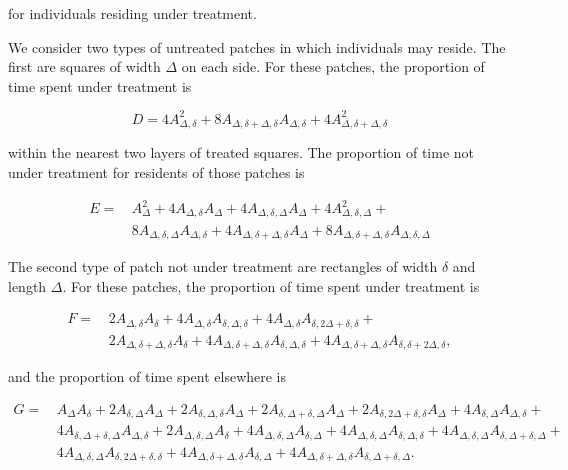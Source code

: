 \documentclass[11pt]{amsart}
\begin{document}
\noindent for individuals residing under treatment.

We consider two types of untreated patches in which individuals may reside. The first are squares of width $\Delta$ on each side. For these patches, the proportion of time spent under treatment is

\begin{equation}
D = 4 A_{\Delta,\delta}^2 +
8 A_{\Delta,\delta+\Delta,\delta} A_{\Delta,\delta} +
4 A_{\Delta,\delta+\Delta,\delta}^2  
\end{equation}

\noindent within the nearest two layers of treated squares. The proportion of time not under treatment for residents of those patches is

\begin{align}
E =\, &A_\Delta^2 + 4 A_{\Delta,\delta} A_{\Delta} +
4 A_{\Delta,\delta,\Delta} A_{\Delta} +
4 A_{\Delta,\delta,\Delta} ^ 2 + \\
&8 A_{\Delta,\delta,\Delta} A_{\Delta,\delta} +
4 A_{\Delta,\delta+\Delta,\delta} A_{\Delta} + 
8 A_{\Delta,\delta+\Delta,\delta} A_{\Delta,\delta,\Delta}
\end{align}

\noindent The second type of patch not under treatment are rectangles of width $\delta$ and length $\Delta$. For these patches, the proportion of time spent under treatment is

\begin{align}
F =\, &2 A_{\Delta,\delta} A_\delta +
4 A_{\Delta,\delta} A_{\delta,\Delta,\delta} + 
4 A_{\Delta,\delta} A_{\delta,2\Delta+\delta,\delta} + \\
&2 A_{\Delta,\delta+\Delta,\delta} A_\delta +
4 A_{\Delta,\delta+\Delta,\delta} A_{\delta,\Delta,\delta} +
4 A_{\Delta,\delta+\Delta,\delta} A_{\delta,\delta+2\Delta,\delta} ,
\end{align}

\noindent and the proportion of time spent elsewhere is

\begin{align}
G =\, &A_\Delta A_\delta + 2 A_{\delta,\Delta} A_\Delta +
2 A_{\delta,\Delta,\delta} A_\Delta +
2 A_{\delta,\Delta+\delta,\Delta} A_\Delta +
2 A_{\delta,2\Delta+\delta,\delta} A_\Delta +
4 A_{\delta,\Delta} A_{\Delta,\delta} + \\
&4 A_{\delta,\Delta+\delta,\Delta} A_{\Delta,\delta} +
2 A_{\Delta,\delta,\Delta} A_\delta +
4 A_{\Delta,\delta,\Delta} A_{\delta,\Delta} +
4 A_{\Delta,\delta,\Delta} A_{\delta,\Delta,\delta} +
4 A_{\Delta,\delta,\Delta} A_{\delta,\Delta+\delta,\Delta} + \\
&4 A_{\Delta,\delta,\Delta} A_{\delta,2\Delta+\delta,\delta} +
4 A_{\Delta,\delta+\Delta,\delta} A_{\delta,\Delta} +
4 A_{\Delta,\delta+\Delta,\delta} A_{\delta,\Delta+\delta,\Delta} .
\end{align}
\end{document}
